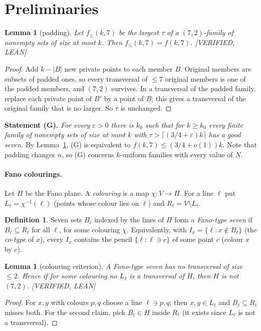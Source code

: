 \documentclass[11pt]{article}
\newtheorem{lemma}[theorem]{Lemma}
\theoremstyle{definition}
\newtheorem{definition}[theorem]{Definition}
\newcommand{\st}[1]{\textsf{\small[#1]}}
\begin{document}
\section{Preliminaries}\label{sec:prelim}

\begin{lemma}[padding]\label{lem:pad}
Let $f_{\le}(k,7)$ be the largest $\tau$ of a $(7,2)$-family of nonempty sets of size at most $k$. Then
$f_\le(k,7)=f(k,7)$. \st{VERIFIED, LEAN}
\end{lemma}
\begin{proof}
Add $k-|B|$ new private points to each member $B$. Original members are subsets of padded ones, so every transversal
of $\le 7$ original members is one of the padded members, and $(7,2)$ survives. In a transversal of the padded family,
replace each private point of $B'$ by a point of $B$; this gives a transversal of the original family that is no
larger. So $\tau$ is unchanged.
\end{proof}

\noindent\textbf{Statement (G).} \emph{For every $\varepsilon>0$ there is $k_0$ such that for $k\ge k_0$ every finite
family of nonempty sets of size at most $k$ with $\tau>\lceil(3/4+\varepsilon)k\rceil$ has a good seven.} By
Lemma~\ref{lem:pad}, (G) is equivalent to $f(k,7)\le(3/4+o(1))k$. Note that padding changes $n$, so (G) concerns
$k$-uniform families with every value of $N$.

\paragraph{Fano colourings.}
Let $\Pi$ be the Fano plane. A \emph{colouring} is a map $\chi:V\to\Pi$. For a line $\ell$ put
$L_\ell=\chi^{-1}(\ell)$ (points whose colour lies on $\ell$) and $R_\ell=V\setminus L_\ell$.

\begin{definition}\label{def:fanoX}
Seven sets $B_\ell$ indexed by the lines of $\Pi$ form a \emph{Fano-type seven} if $B_\ell\subseteq R_\ell$ for all
$\ell$, for some colouring $\chi$. Equivalently, with $I_x=\{\ell:x\notin B_\ell\}$ (the \emph{co-type} of $x$),
every $I_x$ contains the pencil $\{\ell:\ell\ni c\}$ of some point $c$ (colour $x$ by $c$).
\end{definition}

\begin{lemma}[colouring criterion]\label{lem:col}
A Fano-type seven has no transversal of size $\le2$. Hence if for some colouring no $L_\ell$ is a transversal of $H$,
then $H$ is not $(7,2)$. \st{VERIFIED, LEAN}
\end{lemma}
\begin{proof}
For $x,y$ with colours $p,q$ choose a line $\ell\ni p,q$; then $x,y\in L_\ell$ and $B_\ell\subseteq R_\ell$ misses
both. For the second claim, pick $B_\ell\in H$ inside $R_\ell$ (it exists since $L_\ell$ is not a transversal).
\end{proof}
\end{document}
